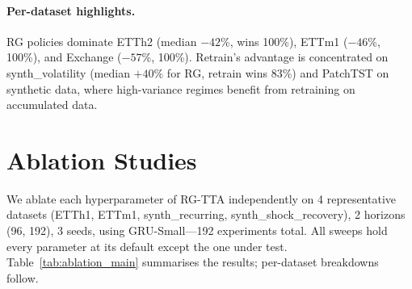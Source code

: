 \documentclass[journal]{IEEEtran}
\begin{document}
\paragraph{Per-dataset highlights.} RG policies dominate ETTh2 (median $-42\%$, wins 100\%), ETTm1 ($-46\%$, 100\%), and Exchange ($-57\%$, 100\%). Retrain's advantage is concentrated on synth\_volatility (median $+40\%$ for RG, retrain wins 83\%) and PatchTST on synthetic data, where high-variance regimes benefit from retraining on accumulated data.


\FloatBarrier
\section{Ablation Studies}
\label{sec:ablation}

We ablate each hyperparameter of RG-TTA independently on 4 representative datasets (ETTh1, ETTm1, synth\_recurring, synth\_shock\_recovery), 2 horizons (96, 192), 3 seeds, using GRU-Small---192 experiments total. All sweeps hold every parameter at its default except the one under test. Table~\ref{tab:ablation_main} summarises the results; per-dataset breakdowns follow.
\end{document}
